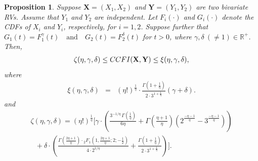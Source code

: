 \documentclass[12pt, a4paper]{article}
\numberwithin{equation}{section}
\newtheorem{proposition}{Proposition}[section]
\begin{document}
\begin{proposition}\label{prop3.1}
Suppose \(\mathbf{X} = (X_1, X_2)\) and \(\mathbf{Y} = (Y_1, Y_2)\) are two bivariate RVs. Assume that \(Y_1\) and \(Y_2\) are independent. Let \(F_i(\cdot)\) and \(G_i(\cdot)\) denote the CDFs of \(X_i\) and \(Y_i\), respectively, for \(i = 1, 2\). Suppose further that  $
G_1(t) = F_1^\gamma(t) \quad \text{and} \quad G_2(t) = F_2^\delta(t) $
for \(t > 0\), where \(\gamma, \delta \ (\neq 1) \in \mathbb{R}^+\). Then,
\begin{align*}
\zeta(\eta,\gamma,\delta)	\leq CCFI(\textbf X,\textbf Y)\leq \xi(\eta,\gamma,\delta),
\end{align*}
where 
\begin{eqnarray*}
\xi(\eta,\gamma,\delta)&=&\left(\eta!\right)^{\frac{1}{\eta}} \cdot \frac{\Gamma\left(1 + \frac{1}{\eta}\right)}{2 \cdot 3^{1 + \frac{1}{\eta}}} (\gamma + \delta).
\end{eqnarray*}
and 
\begin{align*}
	\zeta(\eta,\gamma,\delta)=
	(\eta!)^{\frac{1}{\eta}} \Bigg[
	\gamma \cdot \left(
	\frac{3^{-1/\eta} \, \Gamma\left(\frac{1}{\eta}\right)}{6\eta}
	+ \Gamma\left(\frac{\eta + 1}{\eta}\right) \left(2^{\frac{-\eta - 1}{\eta}} - 3^{\frac{-\eta - 1}{\eta}} \right)
	\right)\\
	~~~+ \delta \cdot \left(
	\frac{\Gamma\left(\frac{2\eta + 1}{\eta}\right) \cdot {}_2F_1\left(1, \frac{2\eta + 1}{\eta}; 2; -\frac{1}{2} \right)}{4 \cdot 2^{1/\eta}}
	+ \frac{\Gamma\left(1 + \frac{1}{\eta}\right)}{2 \cdot 3^{1 + \frac{1}{\eta}}}
	\right)
	\Bigg].
\end{align*}
\end{proposition}
\end{document}
